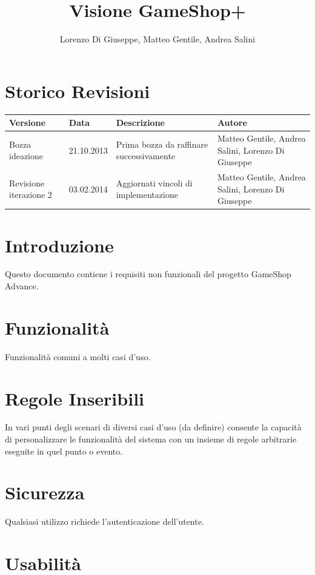 \documentclass[a4paper,10pt]{report}
\title{Visione GameShop+}
\author{Lorenzo Di Giuseppe, Matteo Gentile, Andrea Salini}
\begin{document}
  \maketitle

  
  \section*{Storico Revisioni}
  \begin{center}
    \begin{tabular}{|p{} p{} p{} p{}|}
      \hline
      \textbf{Versione} & \textbf{Data} & \textbf{Descrizione} & \textbf{Autore}\\
      \hline
      Bozza ideazione & 21.10.2013 & Prima bozza da raffinare
      successivamente & Matteo Gentile, Andrea Salini, Lorenzo Di Giuseppe\\
      \hline
      Revisione iterazione 2 & 03.02.2014 & Aggiornati vincoli di implementazione & Matteo Gentile, Andrea Salini, Lorenzo Di Giuseppe\\
      \hline
    \end{tabular}
  \end{center}

  
  \section*{Introduzione}
  Questo documento contiene i requisiti non funzionali del progetto GameShop Advance.

  \section*{Funzionalità}
Funzionalità comuni a molti casi d'uso.

 \section*{Regole Inseribili}
In vari punti degli scenari di diversi casi d’uso (da definire) consente la capacità di personalizzare le funzionalità del sistema con un insieme di regole arbitrarie eseguite in quel punto o evento.

 \section*{Sicurezza}
Qualsiasi utilizzo richiede l’autenticazione dell’utente.

 \section*{Usabilità}
\end{document}
